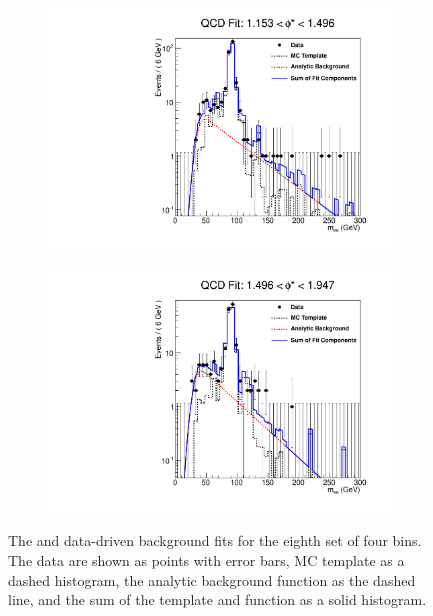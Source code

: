 \begin{figure}[!htbp]
\begin{subfigure}[b]{\SideBySidePlotWidth}
        \includegraphics[width=\linewidth]{figures/qcd_fits/qcd_fit_plot_for_31.pdf}
        \label{fig:qcd_fit_31}
    \end{subfigure}%
    \begin{subfigure}[b]{\SideBySidePlotWidth}
        \includegraphics[width=\linewidth]{figures/qcd_fits/qcd_fit_plot_for_32.pdf}
        \label{fig:qcd_fit_32}
    \end{subfigure}
    \caption[
        The \QCDjets and \wjets data-driven background fits for the eighth set
        of four \phistar bins.
    ]{
        The \QCDjets and \wjets data-driven background fits for the eighth set
        of four \phistar bins. The data are shown as points with error bars, MC
        template as a dashed histogram, the analytic background function as the
        dashed line, and the sum of the template and function as a solid
        histogram.
    }
    \label{fig:qcd_many_8}
\end{figure}

